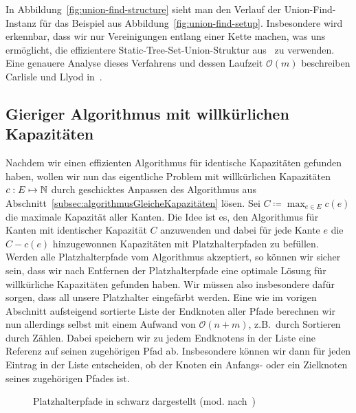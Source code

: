 In Abbildung~\ref{fig:union-find-structure} sieht man den Verlauf der Union-Find-Instanz für das Beispiel aus Abbildung~\ref{fig:union-find-setup}.
Insbesondere wird erkennbar, dass wir nur Vereinigungen entlang einer Kette machen, was uns ermöglicht, die effizientere Static-Tree-Set-Union-Struktur
aus~\cite{static-tree-set-union} zu verwenden.
Eine genauere Analyse dieses Verfahrens und dessen Laufzeit $\mathcal O(m)$ beschreiben Carlisle und Llyod in~\cite{carlisle}.

\subsection{Gieriger Algorithmus mit willkürlichen Kapazitäten}\label{subsec:anpassenAnWillkürlicheKapazitäten}

Nachdem wir einen effizienten Algorithmus für identische Kapazitäten gefunden haben, wollen wir nun das eigentliche Problem mit
willkürlichen Kapazitäten $c: E \mapsto \mathbb N$ durch geschicktes Anpassen des Algorithmus aus Abschnitt~\ref{subsec:algorithmusGleicheKapazitäten}    lösen.
Sei $C \coloneqq \max_{e \in E} c(e)$ die maximale Kapazität aller Kanten.
Die Idee ist es, den Algorithmus für Kanten mit identischer Kapazität $C$ anzuwenden und dabei für jede Kante $e$ die $C - c(e)$
hinzugewonnen Kapazitäten mit Platzhalterpfaden zu befüllen.
Werden alle Platzhalterpfade vom Algorithmus akzeptiert, so können wir sicher sein, dass wir nach Entfernen der
Platzhalterpfade eine optimale Lösung für willkürliche Kapazitäten gefunden haben.
Wir müssen also insbesondere dafür sorgen, dass all unsere Platzhalter eingefärbt werden.
Eine wie im vorigen Abschnitt aufsteigend sortierte Liste der Endknoten aller Pfade berechnen wir nun allerdings selbst mit einem
Aufwand von $\mathcal O(n+m)$, z.B.\ durch Sortieren durch Zählen.
Dabei speichern wir zu jedem Endknotens in der Liste eine Referenz auf seinen zugehörigen Pfad ab.
Insbesondere können wir dann für jeden Eintrag in der Liste entscheiden, ob der Knoten ein Anfangs- oder ein Zielknoten seines zugehörigen Pfades ist.

\begin{figure}[htbp]
	\centering
	\def\svgwidth{250bp}
	
	\caption{Platzhalterpfade in schwarz dargestellt (mod. nach~\cite{paper})}
	\label{fig:dummy-paths}
\end{figure}

